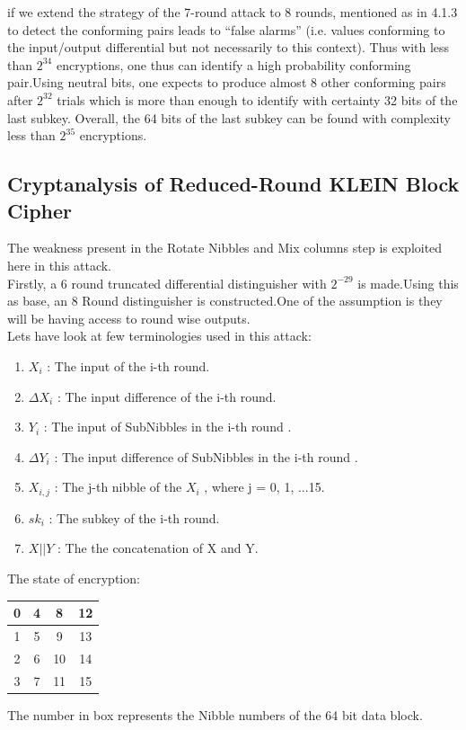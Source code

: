 \documentclass[preprint]{transcrypto}
\begin{document}
if we extend the strategy of the 7-round attack to 8 rounds, mentioned as in 4.1.3 to detect the conforming pairs leads to “false alarms” (i.e. values conforming to the input/output differential
but not necessarily to this context). Thus with less than $2^{34}$ encryptions, one thus can identify a high probability conforming pair.Using neutral bits, one expects to produce almost 8 other conforming pairs after $2^{32}$ trials which is more than enough to identify with certainty 32 bits
of the last subkey. Overall, the 64 bits of the last subkey can be found with complexity less than
$2^{35}$ encryptions.\\





\subsection{Cryptanalysis of Reduced-Round KLEIN Block Cipher} \cite{reduced_round}
The weakness present in the Rotate Nibbles and Mix columns step is exploited here in this attack.\\
Firstly, a 6 round truncated differential distinguisher with $2^{-29}$ is made.Using this as base, an 8 Round distinguisher is constructed.One of the assumption is they will be having access to round wise outputs.\\
Lets have look at few terminologies used in this attack:\\
\begin{enumerate}
    \item $X_{i}$ : The input of the i-th round.
    \item $\Delta X_{i}$ : The input difference of the i-th round.
    \item $Y_{i}$ : The input of SubNibbles in the i-th round .
    \item $\Delta Y_{i}$ : The input difference of SubNibbles in the i-th round .
    \item $X_{i,j}$ : The j-th nibble of the $X_{i}$ , where j = 0, 1, ...15.
    \item $sk_{i}$ : The subkey of the i-th round.
    \item $X || Y$ : The the concatenation of X and Y.
\end{enumerate}
The state of encryption: \\
\begin{center}
\begin{tabular}{|c|c|c|c|}
\hline
0&4&8&12\\
\hline
1&5&9&13\\
\hline
2&6&10&14 \\
\hline
3&7&11&15\\  
\hline
\end{tabular}
\end{center}
The number in box represents the Nibble numbers of the 64 bit data block.
\end{document}
